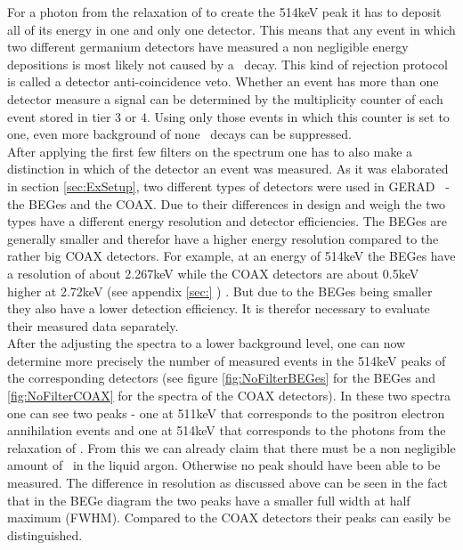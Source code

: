 \documentclass[encoding=utf8,british]{tumphthesis}
\begin{document}
For a photon from the relaxation of  to create the 514keV peak it has to deposit all of its energy in one and only one detector. 
This means that any event in which two different germanium detectors have measured a non negligible energy depositions is most likely not caused by a \Kr\ decay.
This kind of rejection protocol is called a detector anti-coincidence veto.
Whether an event has more than one detector measure a signal can be determined by the multiplicity counter of each event stored in tier 3 or 4.
Using only those events in which this counter is set to one, even more background of none \Kr\ decays can be suppressed.
\\

After applying the first few filters on the spectrum one has to also make a distinction in which of the detector an event was measured.
As it was elaborated in section \ref{sec:ExSetup}, two different types of detectors were used in GERAD \PII\ - the BEGes  and the COAX. 
Due to their differences in design and weigh the two types have a different energy resolution and detector efficiencies. 
The BEGes are generally smaller and therefor have a higher energy resolution compared to the rather big COAX detectors.
For example, at an energy of 514keV the BEGes have a resolution of about 2.267keV while the COAX detectors are about 0.5keV higher at 2.72keV (see appendix \ref{sec:} ) \cite{agostini_background_2017}. 
But due to the BEGes being smaller they also have a lower detection efficiency.
It is therefor necessary to evaluate their measured data separately.
\\

After the adjusting the spectra to a lower background level, one can now determine more precisely the number of measured events in the 514keV peaks of the corresponding detectors (see figure \ref{fig:NoFilterBEGes} for the BEGes and \ref{fig:NoFilterCOAX} for the spectra of the COAX detectors). 
In these two spectra one can see two peaks - one at 511keV that corresponds to the positron electron annihilation events and one at 514keV that corresponds to the photons from the relaxation of .
From this we can already claim that there must be a non negligible amount of \Kr\ in the liquid argon.
Otherwise no peak should have been able to be measured. 
The difference in resolution as discussed above can be seen in the fact that in the BEGe diagram the two peaks have a smaller full width at half maximum (FWHM).
Compared to the COAX detectors their peaks can easily be distinguished.  
\\
\end{document}
